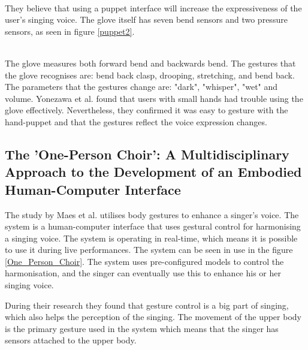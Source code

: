 \begin{minipage}{\linewidth}%
\label{puppet1}
\end{minipage}\\

They believe that using a puppet interface will increase the expressiveness of the user's singing voice. The glove itself has seven bend sensors and two pressure sensors, as seen in figure \ref{puppet2}. \\

\begin{minipage}{\linewidth}%
\label{puppet2}
\end{minipage}\\

The glove measures both forward bend and backwards bend. The gestures that the glove recognises are: bend back clasp, drooping, stretching, and bend back. The parameters that the gestures change are: "dark", "whisper", "wet" and volume. Yonezawa et al. found that users with small hands had trouble using the glove effectively. Nevertheless, they confirmed it was easy to gesture with the hand-puppet and that the gestures reflect the voice expression changes.

\subsection{The 'One-Person Choir': A Multidisciplinary Approach to the Development of an Embodied Human-Computer Interface}
The study by Maes et al. utilises body gestures to enhance a singer's voice\citep{Maes_2011}. The system is a human-computer interface that uses gestural control for harmonising a singing voice. The system is operating in real-time, which means it is possible to use it during live performances. The system can be seen in use in the figure \ref{One_Person_Choir}. The system uses pre-configured models to control the harmonisation, and the singer can eventually use this to enhance his or her singing voice. 

During their research they found that gesture control is a big part of singing, which also helps the perception of the singing. The movement of the upper body is the primary gesture used in the system which means that the singer has sensors attached to the upper body.\\


